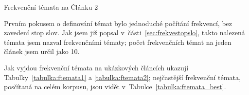 \documentclass[12pt,a4paper]{report}
\begin{document}
 {Frekvenční témata na Článku 2}





Prvním pokusem o definování témat bylo jednoduché počítání frekvencí, bez zavedení stop slov. Jak jsem již popsal v~části~\ref{sec:frekvestopslo}, takto nalezená témata jsem nazval frekvenčními tématy; počet frekvenčních témat na jeden článek jsem určil jako 10. 

Jak vyjdou frekvenční témata na ukázkových článcích ukazují Tabulky~\ref{tabulka:ftemata1} a \ref{tabulka:ftemata2}; nejčastější frekvenční témata, posčítaná na celém korpusu, jsou vidět v~Ta\-bul\-ce~\ref{tabulka:ftemata_best}. 
\end{document}
